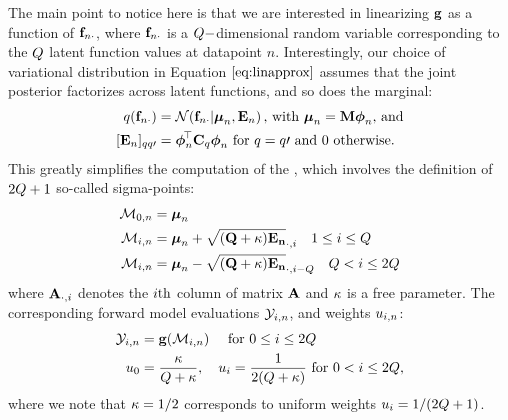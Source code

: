 The main point to notice here is that we are interested in linearizing $\mathbf{g}$ as a function of $\mathbf{f}_{n \cdot}$,
 where $\mathbf{f}_{n \cdot}$ is a $Q-$dimensional random variable corresponding to the 
 $Q$ latent function values at datapoint $n$. Interestingly, our choice of variational 
 distribution in Equation $\eqref{eq:linapprox}$ assumes that the joint posterior factorizes 
 across latent functions, and so does the marginal:
 \begin{align}
 	\label{eq:meanqf}
	q\!\left({ \mathbf{f}_{n \cdot} }\right) &= \mathcal{N}\!\left({\mathbf{f}_{n \cdot}}\middle\vert{ \boldsymbol{ \mu } _n, \mathbf{E}_n}\right) \text{, with  } \boldsymbol{ \mu }_n= \mathbf{M} \boldsymbol\phi_n  \text{, and}\\
	\label{eq:covqf}
	[\mathbf{E}_n]_{qq\prime}  &=  \boldsymbol\phi_n^{\!\top}  \mathbf{C}_q \boldsymbol\phi_n  \text{ for } q = q\prime \text{  and } 0 \text{ otherwise}  \text{.}
 \end{align}
 This greatly simplifies 
the computation of the \ut, which involves the definition of $2Q+1$ so-called sigma-points:
 \begin{align}
\mathcal{M}_{0,n} & = \boldsymbol{ \mu }_n \\
\mathcal{M}_{i,n} & =  \boldsymbol{ \mu }_n +  \mathbf{\sqrt{ (Q + \kappa) \mathbf{E}_n}}_{\cdot,i} \quad 1 \leq i \leq Q \\
\mathcal{M}_{i,n} & = \boldsymbol{ \mu }_n  -  \mathbf{\sqrt{ (Q + \kappa) \mathbf{E}_n}}_{\cdot,i-Q} \quad Q < i \leq   2Q
 \end{align}
where $\mathbf{\mathbf{A}}_{\cdot,i}$ denotes the $i\mathrm{th}$ column of matrix $\mathbf{A}$ and 
$\kappa$ is a free parameter.
The corresponding forward model evaluations $\mathcal{Y}_{i,n}$, and weights $u_{i,n}$:
\begin{align}
 	\mathcal{Y}_{i,n} & = \mathbf{g}(\mathcal{M}_{i,n})   \quad \text{ for } 0 \leq i \leq 2Q\\\
	u_{0} &= \frac{ \kappa}{Q +  \kappa}, \quad
	u_{i} = \frac{1}{2(Q +  \kappa)}  \text{ for }     0  < i  \leq 2Q  \text{,}
\end{align}
 where we note that $\kappa=1/2$ corresponds to uniform weights $u_{i} = 1/(2Q+1)$.
 
